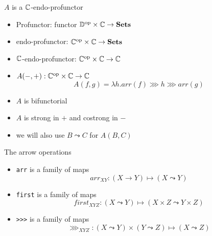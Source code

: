 \begin{frame}[fragile]
\begin{center}\Large $A$ is a $\mathbb{C}$-endo-profunctor\end{center}
    \begin{itemize}
        \item Profunctor: functor ${\mathbb{D}}^{\text{op}} \times \mathbb{C} \to \mathbf{Sets}$
        \item endo-profunctor: ${\mathbb{C}}^{\text{op}} \times \mathbb{C} \to \mathbf{Sets}$
        \item $\mathbb{C}$-endo-profunctor: ${\mathbb{C}}^{\text{op}} \times \mathbb{C} \to \mathbb{C}$
        \item $A(-, +): {\mathbb{C}}^{\text{op}} \times \mathbb{C} \to \mathbb{C}$
            \[
                    A(f, g) = \lambda h. arr(f) \ggg h \ggg arr(g)
            \]
        \item $A$ is bifunctorial
        \item $A$ is strong in $+$ and costrong in $-$
        \item we will also use $B \leadsto C$ for $A(B, C)$
    \end{itemize}
\end{frame}

\begin{frame}[fragile]
    \begin{center}\Large The arrow operations\end{center}
    \begin{itemize}
        \item \verb|arr| is a family of maps
            \[ arr_{XY}: (X \to Y) \mapsto (X \leadsto Y) \]
        \item \verb|first| is a family of maps
            \[ first_{XYZ}: (X \leadsto Y) \mapsto (X \times Z \leadsto Y \times Z) \]
        \item \verb|>>>| is a family of maps
            \[ \ggg_{XYZ}: (X \leadsto Y) \times (Y \leadsto Z) \mapsto (X \leadsto Z) \]
    \end{itemize}
\end{frame}

